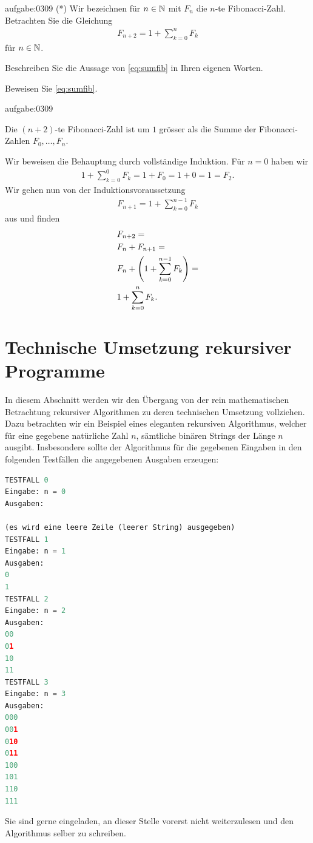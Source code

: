 \begin{aufgabe}{aufgabe:0309}
(*) Wir bezeichnen für $n\in\mathbb{N}$ mit $F_n$ die $n$-te Fibonacci-Zahl. Betrachten Sie die Gleichung
\begin{align}\label{eq:sumfib}
    F_{n+2} = 1 + \sum_{k=0}^{n} F_k
\end{align}
für $n\in\mathbb{N}$.
\begin{aenum}
    \item Beschreiben Sie die Aussage von \cref{eq:sumfib} in Ihren eigenen Worten.
    \item Beweisen Sie \cref{eq:sumfib}.
\end{aenum}
\end{aufgabe}
\begin{antwort}{aufgabe:0309}
\begin{aenum}
    \item Die $(n+2)$-te Fibonacci-Zahl ist um $1$ grösser als die Summe der Fibonacci-Zahlen $F_0,\ldots, F_n$.
    \item Wir beweisen die Behauptung durch vollständige Induktion. Für $n = 0$ haben wir
    \begin{align*}
        1 + \sum_{k=0}^{0} F_k = 1 + F_0 = 1 + 0 = 1 = F_2.
    \end{align*}
    Wir gehen nun von der Induktionsvoraussetzung
    \begin{align*}
        F_{n+1} = 1 + \sum_{k=0}^{n-1} F_k
    \end{align*}
        aus und finden
        \begin{align*}
            &F_{n+2} = \\
            &F_n + F_{n+1} = \\
            &F_n + \left(1 + \sum_{k=0}^{n-1}F_k\right) = \\
            &1 + \sum_{k=0}^{n} F_k.
        \end{align*}
\end{aenum}
\end{antwort}


\clearpage
\section{Technische Umsetzung rekursiver Programme}\label{technisch}
In diesem Abschnitt werden wir den Übergang von der rein mathematischen Betrachtung rekursiver Algorithmen zu deren technischen Umsetzung vollziehen. Dazu betrachten wir ein Beispiel eines eleganten rekursiven Algorithmus, welcher für eine gegebene natürliche Zahl $n$, sämtliche binären Strings der Länge $n$ ausgibt. Insbesondere sollte der Algorithmus für die gegebenen Eingaben in den folgenden Testfällen die angegebenen Ausgaben erzeugen:
\begin{lstlisting}[language=Python,caption=binäre Strings rekursiv ausgeben,numbers=none]
TESTFALL 0
Eingabe: n = 0
Ausgaben:

(es wird eine leere Zeile (leerer String) ausgegeben)
TESTFALL 1
Eingabe: n = 1
Ausgaben:
0
1
TESTFALL 2
Eingabe: n = 2
Ausgaben:
00
01
10
11
TESTFALL 3
Eingabe: n = 3
Ausgaben:
000
001
010
011
100
101
110
111
\end{lstlisting}
Sie sind gerne eingeladen, an dieser Stelle vorerst nicht weiterzulesen und den Algorithmus selber zu schreiben.

